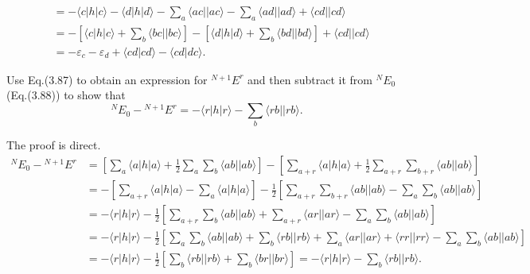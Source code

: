 \documentclass[a4paper]{book}
\newcounter{exercise}[chapter]
\newcounter{solution}[chapter]
\begin{document}
\begin{solution}
\begin{align*}
			&= - \langle c | h | c \rangle - \langle d | h | d \rangle - \sum_a \langle ac || ac \rangle - \sum_a \langle ad || ad \rangle + \langle cd || cd \rangle \\
			&= - \left[ \langle c | h | c \rangle + \sum_b \langle bc || bc \rangle \right] - \left[ \langle d | h | d \rangle + \sum_b \langle bd || bd \rangle \right] + \langle cd || cd \rangle \\
			&= - \varepsilon_c - \varepsilon_d + \langle cd | cd \rangle - \langle cd | dc \rangle .
	\end{align*}		
	
	\end{solution}
	
	\begin{exercise}
	Use Eq.(3.87) to obtain an expression for $^{N+1}E^r$ and then subtract it from $^NE_0$ (Eq.(3.88)) to show that
	\[
		{}^N E_0 - {}^{N+1} E^r = - \langle r | h | r \rangle - \sum_b \langle rb || rb \rangle .
	\]
	\end{exercise}
	
	\begin{solution}
	
	The proof is direct.
	\begin{align*}
		{}^N E_0 - {}^{N+1} E^r &= \left[ \sum_a \langle a | h | a \rangle + \frac{1}{2} \sum_a \sum_b \langle ab || ab \rangle \right] - \left[ \sum_{a+r} \langle a | h | a \rangle + \frac{1}{2} \sum_{a+r} \sum_{b+r} \langle ab || ab \rangle \right] \\
		&= - \left[ \sum_{a+r} \langle a | h | a \rangle - \sum_a \langle a | h | a \rangle \right] - \frac{1}{2} \left[ \sum_{a+r} \sum_{b+r} \langle ab || ab \rangle - \sum_a \sum_b \langle ab || ab \rangle \right] \\
		&= - \langle r | h | r \rangle - \frac{1}{2} \left[ \sum_{a+r} \sum_{b} \langle ab || ab \rangle + \sum_{a+r} \langle ar || ar \rangle - \sum_a \sum_b \langle ab || ab \rangle \right] \\
		&= - \langle r | h | r \rangle - \frac{1}{2} \left[ \sum_a \sum_b \langle ab || ab \rangle + \sum_b \langle rb || rb \rangle + \sum_a \langle ar || ar \rangle + \langle rr || rr \rangle  - \sum_a \sum_b \langle ab || ab \rangle \right] \\
		&= - \langle r | h | r \rangle - \frac{1}{2} \left[  \sum_b \langle rb || rb \rangle + \sum_b \langle br || br \rangle \right] = - \langle r | h | r \rangle - \sum_b \langle rb || rb \rangle .
	\end{align*}
	
	\end{solution}
	
\end{document}

